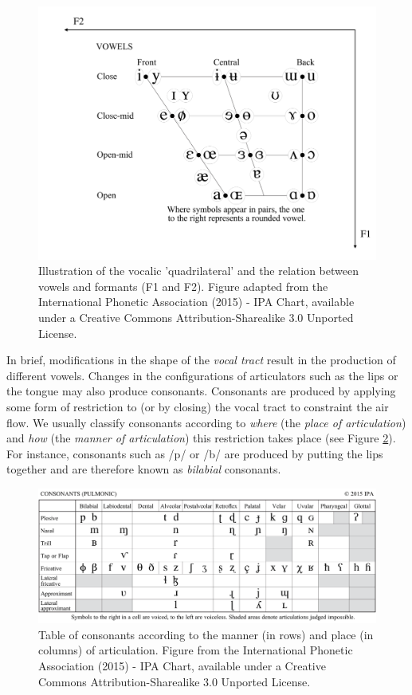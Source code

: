 \documentclass[a4paper,12pt,twoside,openright,oldfontcommands]{memoir}
\begin{document}
\begin{figure}[H]

{\centering \includegraphics[width=0.75\linewidth]{assets/vowels} 

}

\caption{Illustration of the vocalic 'quadrilateral' and the relation between vowels and formants (F1 and F2). Figure adapted from the International Phonetic Association (2015) - IPA Chart, available under a Creative Commons Attribution-Sharealike 3.0 Unported License.}\label{fig:ipa}
\end{figure}

In brief, modifications in the shape of the \emph{vocal tract} result in the production of different vowels. Changes in the configurations of articulators such as the lips or the tongue may also produce consonants. Consonants are produced by applying some form of restriction to (or by closing) the vocal tract to constraint the air flow. We usually classify consonants according to \emph{where} (the \emph{place of articulation}) and \emph{how} (the \emph{manner of articulation}) this restriction takes place (see Figure \ref{fig:consonants}). For instance, consonants such as /p/ or /b/ are produced by putting the lips together and are therefore known as \emph{bilabial} consonants.

\begin{figure}[H]

{\centering \includegraphics[width=1\linewidth]{assets/consonants} 

}

\caption{Table of consonants according to the manner (in rows) and place (in columns) of articulation. Figure from the International Phonetic Association (2015) - IPA Chart, available under a Creative Commons Attribution-Sharealike 3.0 Unported License.}\label{fig:consonants}
\end{figure}
\end{document}
